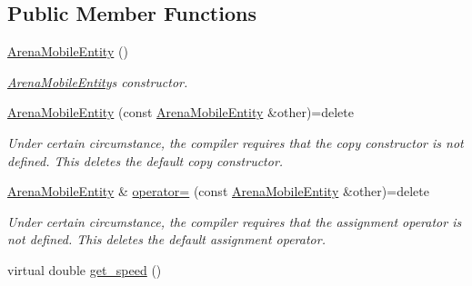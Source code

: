 \subsection*{Public Member Functions}
\begin{DoxyCompactItemize}
\item 
\mbox{\label{class_arena_mobile_entity_a6d038ac71d9b149052fc5a0fec4907f9}} 
\mbox{\hyperlink{class_arena_mobile_entity_a6d038ac71d9b149052fc5a0fec4907f9}{Arena\+Mobile\+Entity}} ()
\begin{DoxyCompactList}\small\item\em \mbox{\hyperlink{class_arena_mobile_entity}{Arena\+Mobile\+Entity}}\textquotesingle{}s constructor. \end{DoxyCompactList}\item 
\mbox{\label{class_arena_mobile_entity_ad662f3efc1a56b64ecaf5633e7ff2139}} 
\mbox{\hyperlink{class_arena_mobile_entity_ad662f3efc1a56b64ecaf5633e7ff2139}{Arena\+Mobile\+Entity}} (const \mbox{\hyperlink{class_arena_mobile_entity}{Arena\+Mobile\+Entity}} \&other)=delete
\begin{DoxyCompactList}\small\item\em Under certain circumstance, the compiler requires that the copy constructor is not defined. This {\ttfamily deletes} the default copy constructor. \end{DoxyCompactList}\item 
\mbox{\label{class_arena_mobile_entity_a34a7f0d094515cafff7611a0f6cf4eee}} 
\mbox{\hyperlink{class_arena_mobile_entity}{Arena\+Mobile\+Entity}} \& \mbox{\hyperlink{class_arena_mobile_entity_a34a7f0d094515cafff7611a0f6cf4eee}{operator=}} (const \mbox{\hyperlink{class_arena_mobile_entity}{Arena\+Mobile\+Entity}} \&other)=delete
\begin{DoxyCompactList}\small\item\em Under certain circumstance, the compiler requires that the assignment operator is not defined. This {\ttfamily deletes} the default assignment operator. \end{DoxyCompactList}\item 
\mbox{\label{class_arena_mobile_entity_a2116341414a3ad0449dc03efa6ea500b}} 
virtual double \mbox{\hyperlink{class_arena_mobile_entity_a2116341414a3ad0449dc03efa6ea500b}{get\+\_\+speed}} ()

\end{DoxyCompactItemize}
